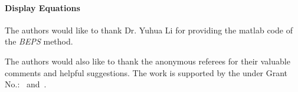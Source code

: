 \paragraph{Display Equations}


\begin{acks}
  The authors would like to thank Dr. Yuhua Li for providing the
  matlab code of  the \textit{BEPS} method. 

  The authors would also like to thank the anonymous referees for
  their valuable comments and helpful suggestions. The work is
  supported by the  under Grant
  No.:~
  and~.

\end{acks}
